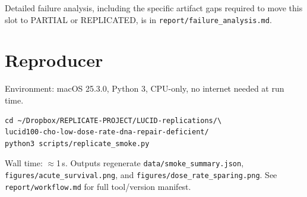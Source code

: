 \documentclass[11pt]{article}
\begin{document}
Detailed failure analysis, including the specific artifact gaps required to move this slot to
PARTIAL or REPLICATED, is in \texttt{report/failure\_analysis.md}.



\section{Reproducer}

Environment: macOS 25.3.0, Python 3, CPU-only, no internet needed at run time.

\begin{verbatim}
cd ~/Dropbox/REPLICATE-PROJECT/LUCID-replications/\
lucid100-cho-low-dose-rate-dna-repair-deficient/
python3 scripts/replicate_smoke.py
\end{verbatim}

Wall time: $\approx$1\,s. Outputs regenerate \texttt{data/smoke\_summary.json},
\texttt{figures/acute\_survival.png}, and \texttt{figures/dose\_rate\_sparing.png}. See
\texttt{report/workflow.md} for full tool/version manifest.
\end{document}
